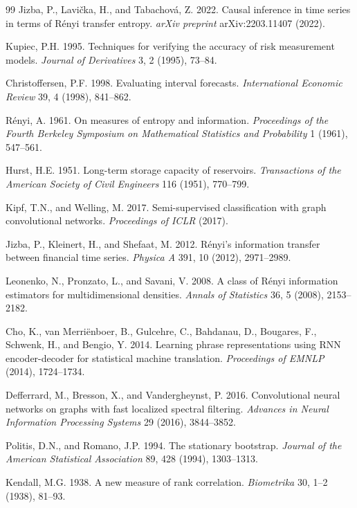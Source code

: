 \documentclass[12pt,oneside]{report}
\begin{document}
\begin{thebibliography}{99}
Jizba, P., Lavička, H., and Tabachová, Z. 2022. Causal inference in time
series in terms of Rényi transfer entropy. \emph{arXiv preprint}
arXiv:2203.11407 (2022).

Kupiec, P.H. 1995. Techniques for verifying the accuracy of risk
measurement models. \emph{Journal of Derivatives} 3, 2 (1995), 73--84.

Christoffersen, P.F. 1998. Evaluating interval forecasts.
\emph{International Economic Review} 39, 4 (1998), 841--862.

Rényi, A. 1961. On measures of entropy and information.
\emph{Proceedings of the Fourth Berkeley Symposium on Mathematical
Statistics and Probability} 1 (1961), 547--561.

Hurst, H.E. 1951. Long-term storage capacity of reservoirs.
\emph{Transactions of the American Society of Civil Engineers} 116
(1951), 770--799.

Kipf, T.N., and Welling, M. 2017. Semi-supervised classification with
graph convolutional networks. \emph{Proceedings of ICLR} (2017).

Jizba, P., Kleinert, H., and Shefaat, M. 2012. Rényi's information
transfer between financial time series. \emph{Physica A} 391, 10 (2012),
2971--2989.

Leonenko, N., Pronzato, L., and Savani, V. 2008. A class of Rényi
information estimators for multidimensional densities. \emph{Annals of
Statistics} 36, 5 (2008), 2153--2182.

Cho, K., van Merriënboer, B., Gulcehre, C., Bahdanau, D., Bougares, F.,
Schwenk, H., and Bengio, Y. 2014. Learning phrase representations using
RNN encoder-decoder for statistical machine translation.
\emph{Proceedings of EMNLP} (2014), 1724--1734.

Defferrard, M., Bresson, X., and Vandergheynst, P. 2016. Convolutional
neural networks on graphs with fast localized spectral filtering.
\emph{Advances in Neural Information Processing Systems} 29 (2016),
3844--3852.

Politis, D.N., and Romano, J.P. 1994. The stationary bootstrap.
\emph{Journal of the American Statistical Association} 89, 428 (1994),
1303--1313.

Kendall, M.G. 1938. A new measure of rank correlation.
\emph{Biometrika} 30, 1--2 (1938), 81--93.


\end{thebibliography}
\end{document}
